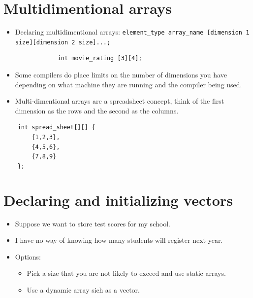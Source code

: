 \section{Multidimentional arrays}
\begin{itemize}
    \item Declaring multidimentional arrays: \verb|element_type array_name [dimension 1 size][dimension 2 size]...;|
        \begin{verbatim}
            int movie_rating [3][4];
        \end{verbatim}
    
    \item Some compilers do place limits on the number of dimensions you have depending on what machine they are running and the compiler being used.
    \item Multi-dimentional arrays are a spreadsheet concept, think of the first dimension as the rows and the second as the columns.
\end{itemize}
\begin{verbatim}
    int spread_sheet[][] {
        {1,2,3},
        {4,5,6},
        {7,8,9}
    };
\end{verbatim}


\section{Declaring and initializing vectors}
\begin{itemize}
    \item Suppose we want to store test scores for my school.
    \item I have no way of knowing how many students will register next year.
    \item Options: 
        \begin{itemize}
            \item Pick a size that you are not likely to exceed and use static arrays.
            \item Use a dynamic array sich as a vector.
        \end{itemize}
\end{itemize}

